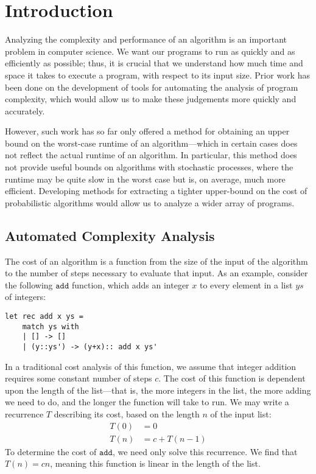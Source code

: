 \chapter{Introduction}
Analyzing the complexity and performance of an algorithm is an important problem in computer science. We want our programs to run as quickly and as efficiently as possible; thus, it is crucial that we understand how much time and space it takes to execute a program, with respect to its input size. Prior work has been done on the development of tools
for automating the analysis of program complexity, which would allow us to make these judgements more quickly and accurately. 

However, such work has so far only offered a method for obtaining an upper bound on the worst-case runtime of an algorithm---which in certain cases does not reflect the actual runtime of an algorithm. In particular, this method does not
provide useful bounds on algorithms with stochastic processes, where the runtime may be quite slow in the worst case but
is, on average, much more efficient. Developing methods for extracting a tighter upper-bound on the cost of probabilistic algorithms would allow us to analyze a wider array of programs.

\section{Automated Complexity Analysis}

The cost of an algorithm is a function from the size of the input of the algorithm to the number of steps necessary to evaluate 
that input. As an example, consider the following $\texttt{add}$ function, which adds an integer $x$ to every element 
in a list $ys$ of integers: \\
\begin{verbatim}
let rec add x ys =
	match ys with
	| [] -> []
	| (y::ys') -> (y+x):: add x ys'
\end{verbatim}
In a traditional cost analysis of this function, we assume that integer addition requires some constant number of steps $c$. The cost of this function is dependent upon the length of the list---that is, the more integers in the list, the more adding we need to
do, and the longer the function will take to run. We may write a recurrence $T$ describing its cost, based on the length
$n$ of the input list:
\begin{align*}
T(0) &= 0 \\
T(n) &= c + T(n-1)
\end{align*}
To determine the cost of $\texttt{add}$, we need only solve this recurrence. We find that $T(n) = cn$, meaning this function
is linear in the length of the list. 


